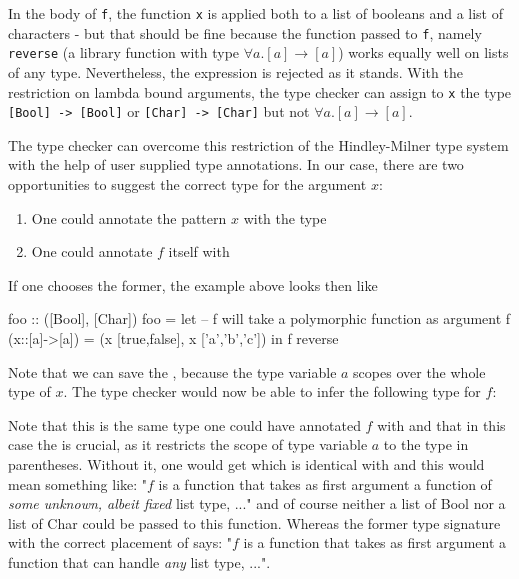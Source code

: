 In the body of \texttt{f}, the function \texttt{x} is applied both to a list of booleans and a list of characters - but that should be fine because the function passed to \texttt{f}, namely \texttt{reverse} (a library function with type $\forall{} a$.$[a] \rightarrow{} [a]$) works equally well on lists of any type. Nevertheless, the expression is rejected as it stands. With the restriction on lambda bound arguments, the type checker can assign to \texttt{x} the type \texttt{[Bool] -> [Bool]} or \texttt{[Char] -> [Char]} but not $\forall{} a$.$[a] \rightarrow{} [a]$.

The \frege{} type checker can overcome this restriction of the Hindley-Milner type system with the help of user supplied type annotations. In our case, there are two opportunities to suggest the correct type for the argument $x$:
\begin{enumerate}
\item One could annotate the pattern $x$ with the type 
\item One could annotate $f$ itself with 
\end{enumerate}

If one chooses the former, the example above looks then like

\begin{code}
foo :: ([Bool], [Char])
foo = let
        -- f will take a polymorphic function as argument
        f (x::[a]->[a]) = (x [true,false], x ['a','b','c'])
    in f reverse
\end{code}

Note that we can save the , because the type variable $a$ scopes over the whole type of $x$.
The type checker would now be able to infer the following type for $f$:

Note that this is the same type one could have annotated $f$ with and that in this case the  is crucial, as it restricts the scope of type variable $a$ to the type in parentheses. Without it, one would get
which is identical with
and this would mean something like: "$f$ is a function that takes as first argument a function of \emph{some unknown, albeit fixed} list type, ..." and of course neither a list of Bool nor a list of Char could be passed to this function. Whereas the former type signature with the correct placement of  says: "$f$ is a function that takes as first argument a function that can handle \emph{any} list type, ...".


